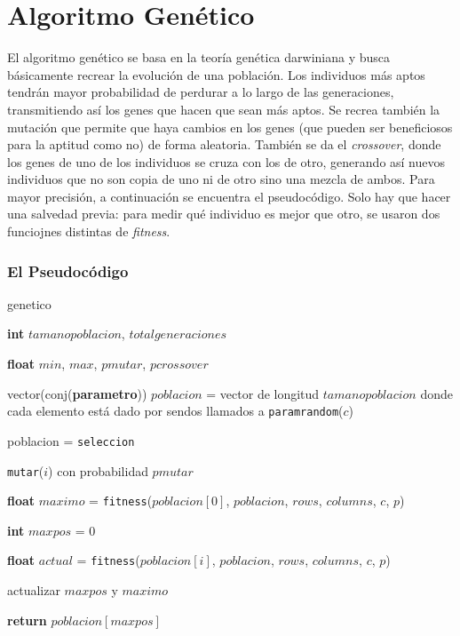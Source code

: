 \documentclass[A4paper,oneside,fleqn,11pt]{article}
\theoremstyle{definition}
\begin{document}
\section{Algoritmo Genético}

El algoritmo genético se basa en la teoría genética darwiniana y busca básicamente recrear la evolución de una población. Los individuos más aptos tendrán mayor probabilidad de perdurar a lo largo de las generaciones, transmitiendo así los genes que hacen que sean más aptos. Se recrea también la mutación que permite que haya cambios en los genes (que pueden ser beneficiosos para la aptitud como no) de forma aleatoria. También se da el \textit{crossover}, donde los genes de uno de los individuos se cruza con los de otro, generando así nuevos individuos que no son copia de uno ni de otro sino una mezcla de ambos. Para mayor precisión, a continuación se encuentra el pseudocódigo. Solo hay que hacer una salvedad previa: para medir qué individuo es mejor que otro, se usaron dos funciojnes distintas de \textit{fitness}.

\subsubsection{El Pseudocódigo}
\begin{algorithm}


 


\caption{genetico}

	\textbf{int} $tamanopoblacion$, $totalgeneraciones$

	\textbf{float} $min$, $max$, $pmutar$, $pcrossover$

	vector(conj(\textbf{parametro})) $poblacion$ = vector de longitud $tamanopoblacion$ donde cada elemento está dado por sendos llamados a \texttt{paramrandom}($c$)

	\For{$generacion = [1..totalgeneraciones$)}

		{

		poblacion = \texttt{seleccion}

			{
			\texttt{mutar}($i$) con probabilidad $pmutar$
			}
		}

	\textbf{float} $maximo$ = \texttt{fitness}($poblacion[0]$, $poblacion$, $rows$, $columns$, $c$, $p$)

	\textbf{int} $maxpos$ = 0

	\For{\textbf{int} $i$ = [1..$poblacion$)}
		{

		\textbf{float} $actual$ = \texttt{fitness}($poblacion[i]$, $poblacion$, $rows$, $columns$, $c$, $p$)

			{

			actualizar $maxpos$ y $maximo$
			}
		}

	\textbf{return} $poblacion[maxpos]$

\end{algorithm}
\end{document}
